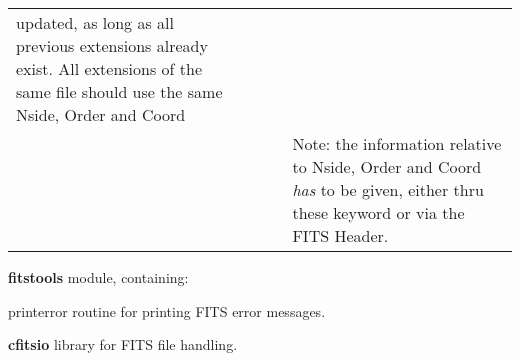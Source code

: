 \begin{arguments}
{\begin{tabular}{p{0.30\hsize} p{0.05\hsize} p{0.08\hsize} p{0.49\hsize}}
		  updated, as long as all previous extensions already exist.
		  All extensions of the same file should use the same Nside,
Order and Coord \\
\  & \ & \ & Note: the information relative to Nside, Order and Coord {\em has} to be
                   given, either thru these keyword or via the FITS Header. \\
\end{tabular}
}
\end{arguments}

\newpage
\begin{modules}
  \begin{sulist}{} %
  \item[\textbf{fitstools}] module, containing:
  \item[printerror] routine for printing FITS error messages.
  \item[\textbf{cfitsio}] library for FITS file handling.		
  \end{sulist}
\end{modules}

